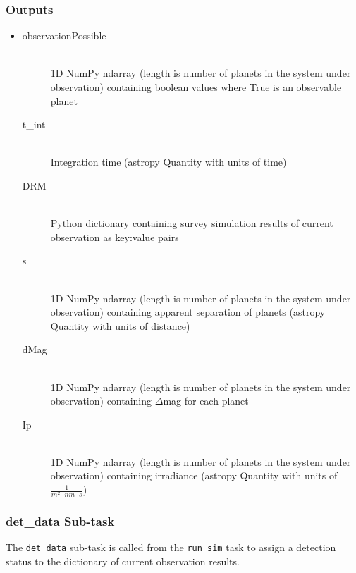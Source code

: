 \documentclass[cleanfoot]{asme2ej}
\begin{document}
\subsubsection*{Outputs}
\begin{itemize}
    \item 
    \begin{description}
        \item[observationPossible] \hfill \\
        1D NumPy ndarray (length is number of planets in the system under observation) containing boolean values where True is an observable planet
        \item[t\_int] \hfill \\
        Integration time (astropy Quantity with units of time)
        \item[DRM] \hfill \\
        Python dictionary containing survey simulation results of current observation as key:value pairs
        \item[s] \hfill \\
        1D NumPy ndarray (length is number of planets in the system under observation) containing apparent separation of planets (astropy Quantity with units of distance)
        \item[dMag] \hfill \\
        1D NumPy ndarray (length is number of planets in the system under observation) containing $ \Delta $mag for each planet
        \item[Ip] \hfill \\
        1D NumPy ndarray (length is number of planets in the system under observation) containing irradiance (astropy Quantity with units of $ \frac{1}{m^2 \cdot nm \cdot s} $)
    \end{description}
\end{itemize}

\subsubsection{det\_data Sub-task} \label{sec:detdatatask}
The \verb+det_data+ sub-task is called from the \verb+run_sim+ task to assign a detection status to the dictionary of current observation results.
\end{document}
